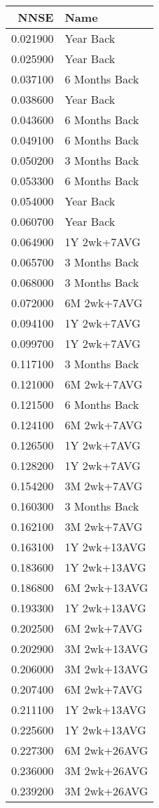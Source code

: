 \begin{tabular}{rl}
NNSE & Name \\
\hline
0.021900 & Year Back \\
0.025900 & Year Back \\
0.037100 & 6 Months Back \\
0.038600 & Year Back \\
0.043600 & 6 Months Back \\
0.049100 & 6 Months Back \\
0.050200 & 3 Months Back \\
0.053300 & 6 Months Back \\
0.054000 & Year Back \\
0.060700 & Year Back \\
0.064900 & 1Y 2wk+7AVG \\
0.065700 & 3 Months Back \\
0.068000 & 3 Months Back \\
0.072000 & 6M 2wk+7AVG \\
0.094100 & 1Y 2wk+7AVG \\
0.099700 & 1Y 2wk+7AVG \\
0.117100 & 3 Months Back \\
0.121000 & 6M 2wk+7AVG \\
0.121500 & 6 Months Back \\
0.124100 & 6M 2wk+7AVG \\
0.126500 & 1Y 2wk+7AVG \\
0.128200 & 1Y 2wk+7AVG \\
0.154200 & 3M 2wk+7AVG \\
0.160300 & 3 Months Back \\
0.162100 & 3M 2wk+7AVG \\
0.163100 & 1Y 2wk+13AVG \\
0.183600 & 1Y 2wk+13AVG \\
0.186800 & 6M 2wk+13AVG \\
0.193300 & 1Y 2wk+13AVG \\
0.202500 & 6M 2wk+7AVG \\
0.202900 & 3M 2wk+13AVG \\
0.206000 & 3M 2wk+13AVG \\
0.207400 & 6M 2wk+7AVG \\
0.211100 & 1Y 2wk+13AVG \\
0.225600 & 1Y 2wk+13AVG \\
0.227300 & 6M 2wk+26AVG \\
0.236000 & 3M 2wk+26AVG \\
0.239200 & 3M 2wk+26AVG \\

\end{tabular}
